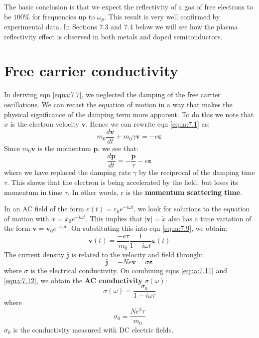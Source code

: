 \documentclass[12pt]{book}
\begin{document}
{The basic conclusion is that we expect the reflectivity of a gas of free electrons to be $100 \%$ for frequencies up to $\omega_p$. This result is very well confirmed by experimental data. In Sections 7.3 and 7.4 below we will see how the plasma reflectivity effect is observed in both metals and doped semiconductors.

\section{Free carrier conductivity}
In deriving eqn \ref{equa:7.7}, we neglected the damping of the free carrier oscillations. We can recast the equation of motion in a way that makes the physical significance of the damping term more apparent. To do this we note that $\dot{x}$ is the electron velocity $\mathbf{v}$. Hence we can rewrite eqn \ref{equa:7.1} as:
\begin{equation}\label{equa:7.9}
  m_0\frac{d\mathbf{v}}{dt}+m_0\gamma\mathbf{v}=-e\bm{\varepsilon}
\end{equation}
Since $m_0\mathbf{v}$ is the momentum $\mathbf{p}$, we see that:
\begin{equation}\label{equa:7.10}
  \frac{d\mathbf{p}}{dt}=-\frac{\mathbf{p}}{\tau}-e\bm{\varepsilon}
\end{equation}
where we have replaced the damping rate $\gamma$ by the reciprocal of the damping time $\tau$. This shows that the electron is being accelerated by the field, but loses its momentum in time $\tau$. In other words, r is the \textbf{momentum scattering time}.

In an AC field of the form $\varepsilon(t) = \varepsilon_0e^{-i\omega t}$, we look for solutions to the equation of motion with $x = x_0e^{-i\omega t}$. This implies that $|\mathbf{v}|= \dot{x}$ also has a time variation of the form $\mathbf{v} = \mathbf{v}_0e^{-i\omega t}$. On substituting this into eqn \ref{equa:7.9}, we obtain:
\begin{equation}\label{equa:7.11}
  \mathbf{v}(t)=\frac{-e\tau}{m_0}\frac{1}{1-i\omega t}\boldsymbol{\varepsilon}(t)
\end{equation}
The current density $\mathbf{j}$ is related to the velocity and field through:
\begin{equation}\label{equa:7.12}
  \mathbf{j}=-Ne\mathbf{v}=\sigma\boldsymbol{\varepsilon}
\end{equation}
where $\sigma$ is the electrical conductivity. On combining eqns \ref{equa:7.11} and \ref{equa:7.12}, we obtain the \textbf{AC conductivity} $\sigma(\omega)$:
\begin{equation}\label{equa:7.13}
  \sigma(\omega)=\frac{\sigma_0}{1-i\omega\tau}
\end{equation}
where
\begin{equation}\label{equa:7.14}
  \sigma_0=\frac{Ne^2\tau}{m_0}
\end{equation}
$\sigma_0$ is the conductivity measured with DC electric fields.

}
\end{document}
